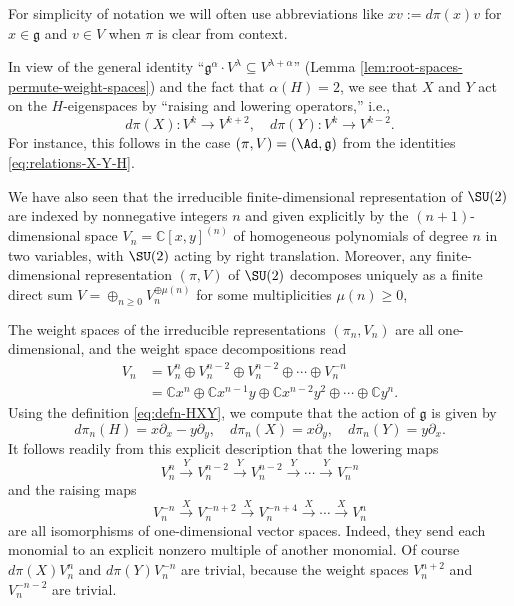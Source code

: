 \documentclass[reqno]{amsart} 
\begin{document}
For simplicity of notation we will often use abbreviations like $x v := d \pi(x) v$ for $x \in \mathfrak{g}$ and $v \in V$ when $\pi$ is clear from context.

In view of the general identity ``$\mathfrak{g}^\alpha \cdot V^{\lambda} \subseteq V^{\lambda+\alpha}$'' (Lemma \ref{lem:root-spaces-permute-weight-spaces}) and the fact that $\alpha(H) = 2$, we see that $X$ and $Y$ act on the $H$-eigenspaces by ``raising and lowering operators,'' i.e.,
\begin{equation}\label{eq:}
  d \pi(X) : V^k \rightarrow V^{k+2}, \quad d \pi(Y) : V^k
  \rightarrow V^{k-2}.
\end{equation}
For instance, this follows in the case $(\pi,V) = (\Ad,\mathfrak{g})$ from the identities \eqref{eq:relations-X-Y-H}.

We have also seen that the irreducible finite-dimensional representation of $\SU(2)$ are indexed by nonnegative integers $n$ and given explicitly by the $(n+1)$-dimensional space $V_n = \mathbb{C}[x,y]^{(n)}$ of homogeneous polynomials of degree $n$ in two variables, with $\SU(2)$ acting by right translation.  Moreover, any finite-dimensional representation $(\pi,V)$ of $\SU(2)$ decomposes uniquely as a finite direct sum $V = \oplus_{n \geq 0} V_n^{\oplus \mu(n)}$ for some multiplicities $\mu(n) \geq 0$,

The weight spaces of the irreducible representations $(\pi_n,V_n)$ are all one-dimensional, and the weight space decompositions read
\begin{align}\label{eq:}
  V_n
  &=
    V_n^{n} \oplus V_n^{n-2} \oplus V_n^{n-2} \oplus \dotsb
    \oplus V_{n}^{-n}
  \\
  &=
    \mathbb{C} x^n
    \oplus \mathbb{C} x^{n-1} y
    \oplus \mathbb{C} x^{n-2} y^2
    \oplus \dotsb \oplus
    \mathbb{C} y^n.
\end{align}
Using the definition \eqref{eq:defn-HXY}, we compute that the action of $\mathfrak{g}$ is given by
\begin{equation}\label{eq:}
  d \pi_n(H) = x \partial_x - y \partial _y,
  \quad d \pi_n(X)
  = x \partial_y,
  \quad
  d \pi_n(Y) = y \partial_x.
\end{equation}
It follows readily from this explicit description that the lowering maps
\begin{equation}\label{eq:}
  V_n^n \xrightarrow{Y} V_n^{n-2}
  \xrightarrow{Y} V_n^{n-2} \xrightarrow{Y} \dotsb
  \xrightarrow{Y} V_n^{-n}
\end{equation}
and the raising maps
\begin{equation}\label{eq:X-raising-isoms}
  V_n^{-n} \xrightarrow{X} V_n^{-n+2}
  \xrightarrow{X} V_n^{-n+4} \xrightarrow{X} \dotsb
  \xrightarrow{X} V_n^{n}
\end{equation}
are all isomorphisms of one-dimensional vector spaces.  Indeed, they send each monomial to an explicit nonzero multiple of another monomial.  Of course $d \pi(X) V_n^n$ and $d \pi(Y) V_n^{-n}$ are trivial, because the weight spaces $V_n^{n+2}$ and $V_n^{-n-2}$ are trivial.
\end{document}
